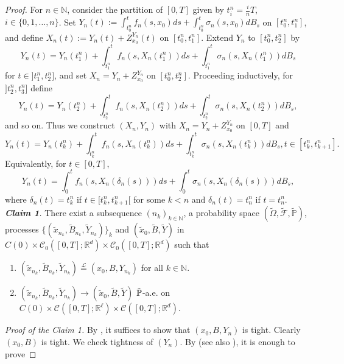 \documentclass[preprint,12pt]{elsarticle}
\newcommand{\R}{\mathbb{R}}
\newcommand{\N}{\mathbb{N}}
\theoremstyle{plain}
\theoremstyle{definition}
\theoremstyle{remark}
\begin{document}
\begin{proof}
For $n\in\N$, consider the partition of $[0,T]$ given by $t_i^n = \frac{i}{n}T$, $i\in\{0,1,\ldots,n\}$. Set $Y_n(t) := \int_{t_0^n}^tf_n(s,x_0)ds + \int_{t_0^n}^t\sigma_n(s,x_0)dB_s$ on $[t_0^n,t_1^n]$, and define $X_n(t) :=Y_n(t) + Z^{Y_n}_{x_0}(t)$ on $[t_0^n,t_1^n]$. Extend $Y_n$ to $[t_0^n,t_2^n]$ by 
		\begin{equation*}
			Y_n(t) = Y_n(t_1^n) + \int_{t_1^n}^{t}f_n(s,X_n(t_1^n))ds + \int_{t_1^n}^{t}\sigma_n(s,X_n(t_1^n))dB_s
		\end{equation*}
		for $t\in ]t_1^n,t_2^n]$, and set $X_n = Y_n + Z^{Y_n}_{x_0}$ on $[t_0^n,t_2^n]$. Proceeding inductively,  for $]t_2^n,t_3^n]$  define
		\begin{equation*}
			Y_n(t) = Y_n(t_2^n) + \int_{t_2^n}^{t}f_n(s,X_n(t_2^n))ds + \int_{t_2^n}^{t}\sigma_n(s,X_n(t_2^n))dB_s,
		\end{equation*}
        and so on. Thus we construct $(X_n,Y_n)$ with $X_n = Y_n + Z^{Y_n}_{x_0}$ on $[0,T]$ and  
		\begin{equation*}
			Y_n(t) = Y_n(t_k^n) + \int_{t_k^n}^{t}f_n(s,X_n(t_k^n))ds + \int_{t_k^n}^{t}\sigma_n(s,X_n(t_k^n))dB_s,  t\in [t_k^n,t_{k+1}^n].
		\end{equation*}
		Equivalently, for $t\in [0,T]$,
		\begin{equation*}
			Y_n(t) = \int_{0}^t f_n(s,X_n(\delta_n(s)))ds + \int_{0}^t \sigma_n(s,X_n(\delta_n(s)))dB_s,
		\end{equation*}
		where $\delta_n(t) = t_k^n$ if $t\in [t_k^n,t_{k+1}^n[$ for some $k<n$ and $\delta_n(t) = t_n^n$ if $t=t_n^n$.\\
\emph{\textbf{Claim 1}.} There exist a subsequence $(n_k)_{k\in\N}$, a probability space $(\tilde{\Omega},\tilde{\mathcal{F}},\tilde{\mathbb{P}})$,  processes $\{(\tilde{x}_{n_k},\tilde{B}_{n_k},\tilde{Y}_{n_k})\}_{k}$ and $(\tilde{x}_0,\tilde{B},\tilde{Y})$ in $C(0)\times \mathcal{C}_0([0,T];\R^d)\times \mathcal{C}_0([0,T];\R^d)$ such that
			\begin{enumerate}
\item [(a)] $(\tilde{x}_{n_k},\tilde{B}_{n_k},\tilde{Y}_{n_k}) \stackrel{\mathscr{L}}{=} (x_0,B,Y_{n_k})$ for all $k\in\N$.
\item [(b)] $(\tilde{x}_{n_k},\tilde{B}_{n_k},\tilde{Y}_{n_k}) \to (\tilde{x}_0,\tilde{B},\tilde{Y})$ $\Tilde{\mathbb{P}}$-a.e. on $C(0)\times \mathcal{C}([0,T];\R^\ell)\times \mathcal{C}([0,T];\R^d)$.
		\end{enumerate}
\noindent \emph{Proof of the Claim 1.} By \cite[Theorem 1.45]{MR3308895}, it suffices to show that $(x_0,B,Y_n)$ is tight. Clearly $(x_0,B)$ is tight. We check tightness of $(Y_n)$. By \cite[Theorem I.4.2 \& I.4.3]{zbMATH03780265} (see also \cite[Problem 4.11, p. 64]{MR1121940}), it is enough to prove 

\end{proof}
\end{document}
